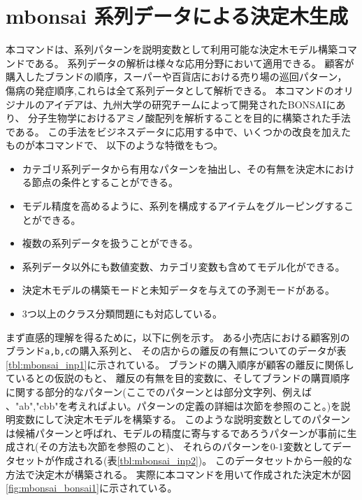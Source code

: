 



\section{mbonsai 系列データによる決定木生成\label{sect:mbonsai}}
本コマンドは、系列パターンを説明変数として利用可能な決定木モデル構築コマンドである。
系列データの解析は様々な応用分野において適用できる。
顧客が購入したブランドの順序，スーパーや百貨店における売り場の巡回パターン，
傷病の発症順序,これらは全て系列データとして解析できる。
本コマンドのオリジナルのアイデアは、九州大学の研究チームによって開発されたBONSAI\cite{SSS94}にあり、
分子生物学におけるアミノ酸配列を解析することを目的に構築された手法である。
この手法をビジネスデータに応用する中で、いくつかの改良を加えたものが本コマンドで、
以下のような特徴をもつ。

\begin{itemize}
 \item カテゴリ系列データから有用なパターンを抽出し、その有無を決定木における節点の条件とすることができる。
 \item モデル精度を高めるように、系列を構成するアイテムをグルーピングすることができる。
 \item 複数の系列データを扱うことができる。
 \item 系列データ以外にも数値変数、カテゴリ変数も含めてモデル化ができる。
 \item 決定木モデルの構築モードと未知データを与えての予測モードがある。
 \item 3つ以上のクラス分類問題にも対応している。
\end{itemize}

まず直感的理解を得るために，以下に例を示す。
ある小売店における顧客別のブランド\verb|a,b,c|の購入系列と、
その店からの離反の有無についてのデータが表\ref{tbl:mbonsai_inp1}に示されている。
ブランドの購入順序が顧客の離反に関係しているとの仮説のもと、
離反の有無を目的変数に、そしてブランドの購買順序に関する部分的なパターン(ここでのパターンとは部分文字列、例えば
、"ab","cbb"を考えればよい。パターンの定義の詳細は次節を参照のこと。)を説明変数にして決定木モデルを構築する。
このような説明変数としてのパターンは候補パターンと呼ばれ、モデルの精度に寄与するであろうパターンが事前に生成され(その方法も次節を参照のこと)、
それらのパターンを0-1変数としてデータセットが作成される(表\ref{tbl:mbonsai_inp2})。
このデータセットから一般的な方法で決定木が構築される。
実際に本コマンドを用いて作成された決定木が図\ref{fig:mbonsai_bonsai1}に示されている。

